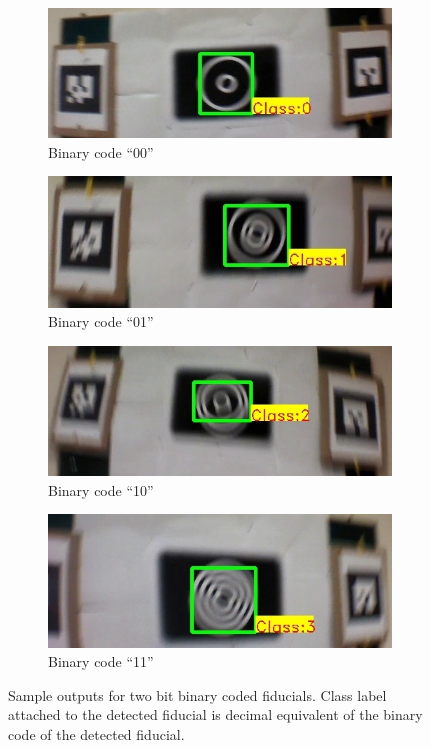 \documentclass[runningheads]{llncs}
\begin{document}
\begin{figure}[hb!]
\begin{subfigure}{0.5\textwidth}
\centering
  \includegraphics[width=\linewidth]{output_00.jpg}
  \caption{Binary code ``00''}
  \label{fig:output0}
\end{subfigure}
\begin{subfigure}{0.5\textwidth}
\centering
  \includegraphics[width=\linewidth]{output_01.jpg}
  \caption{Binary code ``01''}
  \label{fig:output1}
\end{subfigure}
\begin{subfigure}{0.5\textwidth}
\centering
  \includegraphics[width=\linewidth]{output_10.jpg}
  \caption{Binary code ``10''}
  \label{fig:output2}
\end{subfigure}
\begin{subfigure}{0.5\textwidth}
\centering
  \includegraphics[width=\linewidth]{output_11.jpg}
  \caption{Binary code ``11''}
  \label{fig:output3}
  \end{subfigure}
  \caption{Sample outputs for two bit binary coded fiducials. Class label
  attached to the detected fiducial is decimal equivalent of the binary code of
  the detected fiducial.}
\end{figure}
\end{document}
